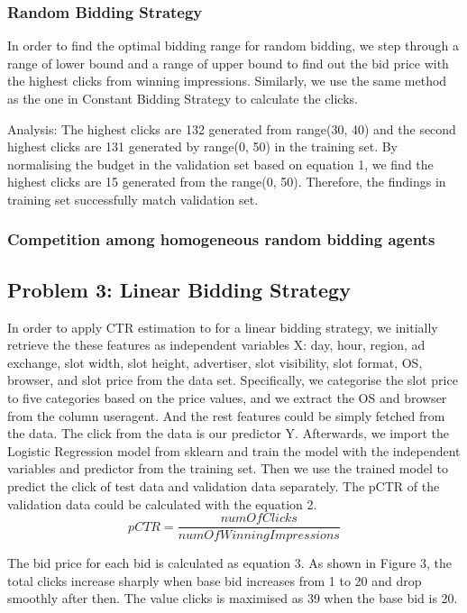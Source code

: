 \documentclass{sig-alternate-05-2015}
\begin{document}
\subsubsection{Random Bidding Strategy}
In order to find the optimal bidding range for random bidding, we step through a range of lower bound and a range of upper bound to find out the bid price with the highest clicks from winning impressions. Similarly, we use the same method as the one in Constant Bidding Strategy to calculate the clicks. 

Analysis: 
The highest clicks are 132 generated from range(30, 40) and the second highest clicks are 131 generated by range(0, 50) in the training set. By normalising the budget in the validation set based on equation 1, we find the highest clicks are 15 generated from the range(0, 50). Therefore, the findings in training set successfully match validation set. 

\subsubsection{Competition among homogeneous random bidding agents}

\subsection{Problem 3: Linear Bidding Strategy}
In order to apply CTR estimation to for a linear bidding strategy, we initially retrieve the these features as independent variables X: day, hour, region, ad exchange, slot width, slot height, advertiser, slot visibility, slot format, OS, browser, and slot price from the data set. Specifically, we categorise the slot price to five categories based on the price values, and we extract the OS and browser from the column useragent. And the rest features could be simply fetched from the data. The click from the data is our predictor Y.
Afterwards, we import the Logistic Regression model from sklearn and train the model with the independent variables and predictor from the training set. Then we use the trained model to predict the click of test data and validation data separately. The pCTR of the validation data could be calculated with the equation 2.
\begin{equation}pCTR=\frac{numOfClicks}{numOfWinningImpressions}\end{equation}

The bid price for each bid is calculated as equation 3. As shown in Figure 3, the total clicks increase sharply when base bid increases from 1 to 20 and drop smoothly after then. The value clicks is maximised as 39 when the base bid is 20.
\end{document}
